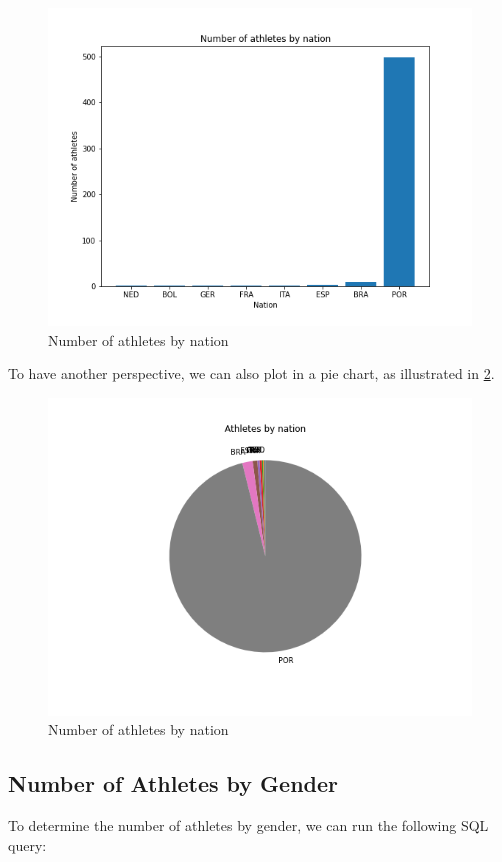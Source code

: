 \begin{figure}[H]
    \centering
    \includegraphics[width=.8\textwidth]{img/athletesbynation}
    \caption{Number of athletes by nation}
    \label{fig:athletesbynation}
\end{figure}

To have another perspective, we can also plot in a pie chart, as illustrated in \cref{fig:athletesbynation-pie}.

\begin{figure}[H]
    \centering
    \includegraphics[width=.8\textwidth]{img/athletesbynation-piechart}
    \caption{Number of athletes by nation}
    \label{fig:athletesbynation-pie}
\end{figure}

\subsection{Number of Athletes by Gender}\label{subsec:number-of-athletes-by-gender}

To determine the number of athletes by gender, we can run the following SQL query:


